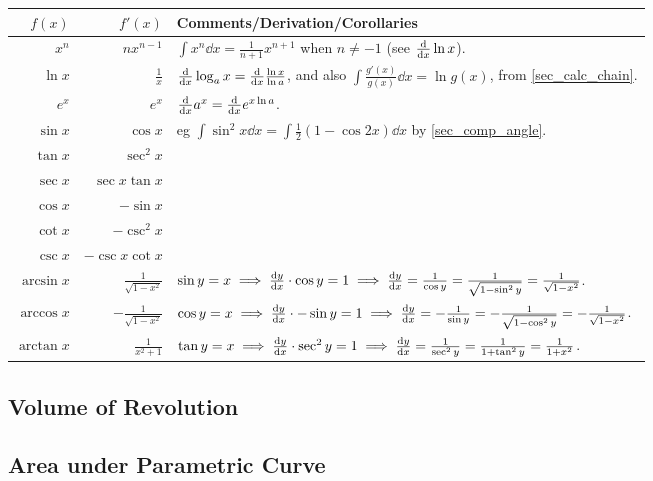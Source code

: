 \documentclass[fleqn,a4paper,11pt]{article}
\begin{document}
    \begin{longtable}{rrl}
    \toprule
    \boldmath\(f(x)\) & \boldmath\(f'(x)\) &
    \bfseries Comments/Derivation/Corollaries \\
    \midrule
    \endhead
    \(x^n\) & \(nx^{n-1}\)
        & \(\int x^n \dd{x} = \frac{1}{n + 1}x^{n + 1}\) when
          \(n \neq -1\) (see \(\dv{}{x}\ln x\)).\\
    \(\ln x\) & \(\frac{1}{x}\)
        & \(\dv{}{x}\log_a x = \dv{}{x} \frac{\ln x}{\ln a}\), and also
          \(\int \frac{g'(x)}{g(x)} \dd{x} = \ln g(x)\),
            from \ref{sec_calc_chain}.\\
    \(e^x\) & \(e^x\) & \(\dv{}{x}a^x = \dv{}{x}e^{x \ln a}\). \\
    \(\sin x\) & \(\cos x\)
        & eg \(\int \sin^2 x \dd{x} = \int \frac 12 (1 - \cos 2x) \dd{x}\)
          by \ref{sec_comp_angle}. \\
    \(\tan x\) & \(\sec^2 x\) \\
    \(\sec x\) & \(\sec x \tan x\) \\
    \(\cos x\) & \(-\sin x\) \\
    \(\cot x\) & \(-\csc^2 x\) \\
    \(\csc x\) & \(-\csc x \cot x\) \\
    \(\arcsin x\) & \(\frac{1}{\sqrt{1 - x^2}}\)
        & \(\sin y = x \implies \dv{y}{x} \cdot \cos y = 1 \implies
           \dv{y}{x} = \frac{1}{\cos y}
         = \frac{1}{\sqrt{1 - \sin^2 y}} = \frac{1}{\sqrt{1 - x^2}}\). \\
    \(\arccos x\) & \(-\frac{1}{\sqrt{1 - x^2}}\)
        & \(\cos y = x \implies \dv{y}{x} \cdot -\sin y = 1 \implies
           \dv{y}{x} = -\frac{1}{\sin y}
         = -\frac{1}{\sqrt{1 - \cos^2 y}} = -\frac{1}{\sqrt{1 - x^2}}\). \\
    \(\arctan x\) & \(\frac{1}{x^2 + 1}\)
        & \(\tan y = x \implies \dv{y}{x} \cdot \sec^2 y = 1 \implies
           \dv{y}{x} = \frac{1}{\sec^2 y} = \frac{1}{1 + \tan^2 y}
         = \frac{1}{1 + x^2}\). \\
    \bottomrule
    \end{longtable}

    \subsection{Volume of Revolution}

    \subsection{Area under Parametric Curve} \label{sec_calc_parametric_area}
\end{document}
